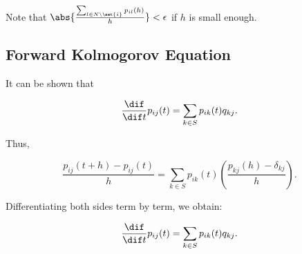 \documentclass[11pt]{scrartcl}
\begin{document}
  Note that $\abs{\frac{\sum_{l \in N\setminus \set{i}}p_{il}(h)}{h}} < \epsilon$ if $h$ is small enough.

  \subsection{Forward Kolmogorov Equation}

  It can be shown that
  
  \begin{equation*}
    \frac{\dif }{\dif t} p_{ij}(t) = \sum_{k\in S} p_{ik}(t)q_{kj}.
  \end{equation*}

  Thus,

  \begin{equation*}
    \frac{p_{ij}(t+h) - p_{ij}(t)}{h} = \sum_{k\in S}p_{ik}(t) \left( \frac{p_{kj}(h) - \delta_{kj}}{h}\right).
  \end{equation*}

  Differentiating both sides term by term, we obtain:
  
  \begin{equation*}
    \frac{\dif }{\dif t}p_{ij}(t) = \sum_{k\in S}p_{ik}(t)q_{kj}.
  \end{equation*}
\end{document}
